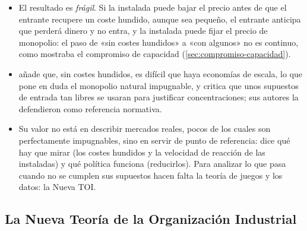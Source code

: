 \documentclass[11pt]{article}
\begin{document}
\begin{itemize}
\item El resultado es \emph{frágil}. Si la instalada puede bajar el precio antes de que el entrante recupere un coste hundido, aunque sea pequeño, el entrante anticipa que perderá dinero y no entra, y la instalada puede fijar el precio de monopolio\nocite{SchwartzReynolds1983Contestable,Stiglitz1987Technological}: el paso de «sin costes hundidos» a «con algunos» no es continuo, como mostraba el compromiso de capacidad (\ref{sec:compromiso-capacidad}).
\item \textcite{Weitzman1983Contestable} añade que, sin costes hundidos, es difícil que haya economías de escala, lo que pone en duda el monopolio natural impugnable, y \textcite{Shepherd1984Contestability} critica que unos supuestos de entrada tan libres se usaran para justificar concentraciones; sus autores la defendieron como referencia normativa\nocite{BaumolPanzarWillig1983Reply}.
\item Su valor no está en describir mercados reales, pocos de los cuales son perfectamente impugnables\nocite{Spence1983Contestable}, sino en servir de punto de referencia: dice qué hay que mirar (los costes hundidos y la velocidad de reacción de las instaladas) y qué política funciona (reducirlos). Para analizar lo que pasa cuando no se cumplen sus supuestos hacen falta la teoría de juegos y los datos: la Nueva TOI.
\end{itemize}

\subsection{La Nueva Teoría de la Organización Industrial}\label{sec:nueva-toi}
\end{document}
